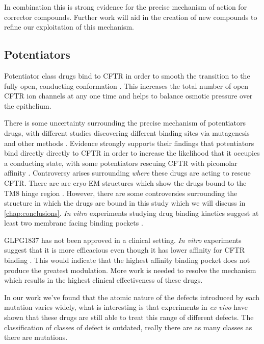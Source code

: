 In combination this is strong evidence for the precise mechanism of action for corrector compounds. Further work will aid in the creation of new compounds to refine our exploitation of this mechanism.

\subsection{Potentiators}
Potentiator class drugs bind to CFTR in order to smooth the transition to the fully open, conducting conformation \cite{jih2013,yeh2017}. This increases the total number of open CFTR ion channels at any one time and helps to balance osmotic pressure over the epithelium.

There is some uncertainty surrounding the precise mechanism of potentiators drugs, with different studies discovering different binding sites via mutagenesis and other methods \cite{yeh2019, liu2019, laselva2021}. Evidence strongly supports their findings that potentiators bind directly directly to CFTR in order to increase the likelihood that it occupies a conducting state, with some potentiators rescuing CFTR with picomolar affinity \cite{csanady2019}. Controversy arises surrounding \textit{where} these drugs are acting to rescue CFTR. There are are cryo-EM structures which show the drugs bound to the TM8 hinge region \cite{liu2019}. However, there are some controversies surrounding the structure in which the drugs are bound in this study which we will discuss in \ref{chap:conclusions}. \textit {In vitro} experiments studying drug binding kinetics suggest at least two membrane facing binding pockets \cite{csanady2019}. 

GLPG1837 has not been approved in a clinical setting. \textit {In vitro} experiments suggest that it is more efficacious even though it has lower affinity for CFTR binding \cite{vanderplas2018}. This would indicate that the highest affinity binding pocket does not produce the greatest modulation. More work is needed to resolve the mechanism which results in the highest clinical effectiveness of these drugs.  

In our work we've found that the atomic nature of the defects introduced by each mutation varies widely, what is interesting is that experiments in \textit{ex vivo} have shown that these drugs are still able to treat this range of different defects. The classification of classes of defect is outdated, really there are as many classes as there are mutations.


